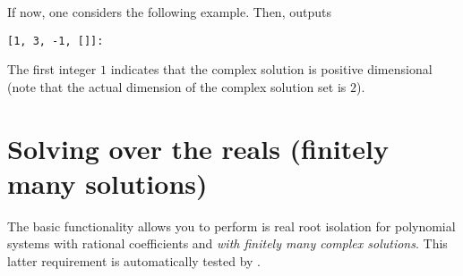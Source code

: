 \documentclass[a4paper,english,11pt]{scrartcl}
\theoremstyle{definition}
\theoremstyle{remark}
\begin{document}
If now, one considers the following example.
Then, \msolve outputs
\begin{tcolorbox} %
  \begin{lstlisting}[basicstyle=\normalsize\ttfamily]
[1, 3, -1, []]:
  \end{lstlisting}
\end{tcolorbox}
The first integer $1$ indicates that the complex solution is positive
dimensional (note that the actual dimension of the complex solution set is $2$).


\section{Solving over the reals (finitely many solutions)}\label{sec:solvingreals}

The basic functionality \msolve allows you to perform is real root
isolation for polynomial systems with rational coefficients and {\em with
  finitely many complex solutions}. This latter requirement is automatically
tested by \msolve. 
\end{document}
